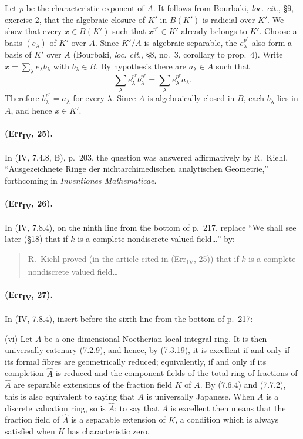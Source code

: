 Let $p$ be the characteristic exponent of $A$.  It follows from
Bourbaki, \emph{loc. cit.}, \S9, exercise 2, that the algebraic closure
of $K'$ in $B(K')$ is radicial over $K'$.  We show that every
$x\in B(K')$ such that $x^{p^r}\in K'$ already belongs to $K'$.
Choose a basis $(e_\lambda)$ of $K'$ over $A$.  Since $K'/A$ is
algebraic separable, the $e_\lambda^{p^r}$ also form a basis of $K'$ over
$A$ (Bourbaki, \emph{loc. cit.}, \S8, no.~3, corollary to prop.~4).
Write $x=\sum_\lambda e_\lambda b_\lambda$ with $b_\lambda\in B$.  By
hypothesis there are $a_\lambda\in A$ such that
\[
 \sum_\lambda e_\lambda^{p^r}b_\lambda^{p^r}
 =\sum_\lambda e_\lambda^{p^r}a_\lambda.
\]
Therefore $b_\lambda^{p^r}=a_\lambda$ for every $\lambda$.  Since $A$
is algebraically closed in $B$, each $b_\lambda$ lies in $A$, and hence
$x\in K'$.

\paragraph{(Err\textsubscript{IV}, 25).}
In (IV, 7.4.8, B), p.~203, the question was answered affirmatively by
R.~Kiehl, ``Ausgezeichnete Ringe der nichtarchimedischen analytischen
Geometrie,'' forthcoming in \emph{Inventiones Mathematicae}.

\paragraph{(Err\textsubscript{IV}, 26).}
In (IV, 7.8.4), on the ninth line from the bottom of p.~217, replace
``We shall see later (\S18) that if $k$ is a complete nondiscrete valued
field\ldots'' by:
\begin{quote}
R.~Kiehl proved (in the article cited in
(Err\textsubscript{IV}, 25)) that if $k$ is a complete nondiscrete
valued field\ldots
\end{quote}

\paragraph{(Err\textsubscript{IV}, 27).}
In (IV, 7.8.4), insert before the sixth line from the bottom of p.~217:

\smallskip
\noindent
\textup{(vi)} Let $A$ be a one-dimensional Noetherian local integral
ring.  It is then universally catenary (7.2.9), and hence, by (7.3.19),
it is excellent if and only if its formal fibres are geometrically
reduced; equivalently, if and only if its completion $\widehat A$ is
reduced and the component fields of the total ring of fractions of
$\widehat A$ are separable extensions of the fraction field $K$ of
$A$.  By (7.6.4) and (7.7.2), this is also equivalent to saying that
$A$ is universally Japanese.  When $A$ is a discrete valuation ring,
so is $\widehat A$; to say that $A$ is excellent then means that the
fraction field of $\widehat A$ is a separable extension of $K$, a
condition which is always satisfied when $K$ has characteristic zero.

